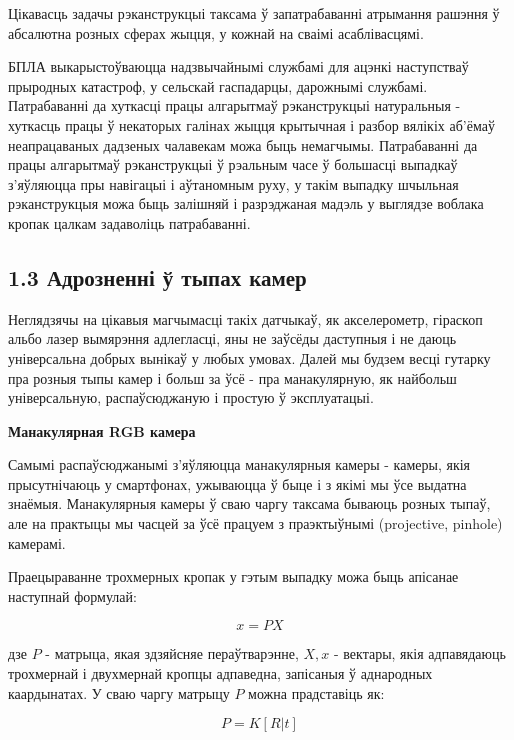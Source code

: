 Цікавасць задачы рэканструкцыі таксама ў запатрабаванні атрымання рашэння ў абсалютна розных сферах
жыцця, у кожнай на сваімі асаблівасцямі.

БПЛА выкарыстоўваюцца надзвычайнымі службамі для ацэнкі наступстваў прыродных катастроф,
у сельскай гаспадарцы, дарожнымі службамі. Патрабаванні да хуткасці працы алгарытмаў рэканструкцыі
натуральныя - хуткасць працы ў некаторых галінах жыцця крытычная і разбор вялікіх аб'ёмаў
неапрацаваных дадзеных чалавекам можа быць немагчымы. Патрабаванні да працы алгарытмаў
рэканструкцыі ў рэальным часе ў большасці выпадкаў з'яўляюцца пры навігацыі і
аўтаномным руху, у такім выпадку шчыльная рэканструкцыя можа быць залішняй і
разрэджаная мадэль у выглядзе воблака кропак цалкам задаволіць патрабаванні.

\subsection*{1.3 Адрозненні ў тыпах камер}

Неглядзячы на цікавыя магчымасці такіх датчыкаў, як акселерометр, гіраскоп альбо
лазер вымярэння адлегласці, яны не заўсёды даступныя і не даюць універсальна добрых
вынікаў у любых умовах. Далей мы будзем весці гутарку пра розныя тыпы камер і
больш за ўсё - пра манакулярную, як найбольш універсальную, распаўсюджаную і простую
ў эксплуатацыі.

\vspace{5mm}
{\bf Манакулярная RGB камера}

Самымі распаўсюджанымі з'яўляюцца манакулярныя камеры - камеры, якія прысутнічаюць
у смартфонах, ужываюцца ў быце і з якімі мы ўсе выдатна знаёмыя.
Манакулярныя камеры ў сваю чаргу таксама бываюць розных тыпаў,
але на практыцы мы часцей за ўсё працуем з праэктыўнымі (projective, pinhole) камерамі.

Праецыраванне трохмерных кропак у гэтым выпадку можа быць апісанае наступнай формулай:

\begin{equation}
  x = PX
\end{equation}

дзе $P$ - матрыца, якая здзяйсняе пераўтварэнне, $X, x$ - вектары, якія адпавядаюць
трохмернай і двухмернай кропцы адпаведна, запісаныя ў аднародных каардынатах.
У сваю чаргу матрыцу $P$ можна прадставіць як:

\begin{equation}
  P = K[R|t]
\end{equation}

